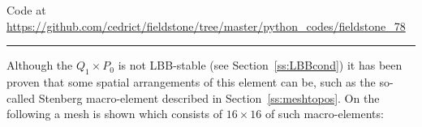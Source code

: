 

\begin{center}
Code at \url{https://github.com/cedrict/fieldstone/tree/master/python_codes/fieldstone_78}
\end{center}

\par\noindent\rule{\textwidth}{0.4pt}



Although the $Q_1\times P_0$ is not LBB-stable (see Section~\ref{ss:LBBcond})
it has been proven that some spatial arrangements of this element can be, such as the
so-called Stenberg macro-element described in Section~\ref{ss:meshtopos}.
On the following a mesh is shown which consists of $16\times 16$ of such macro-elements:

